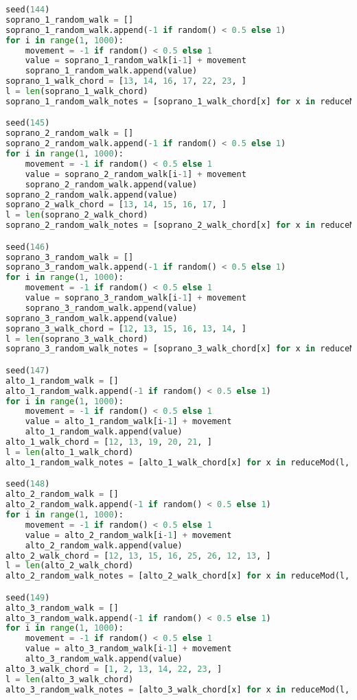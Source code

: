 \begin{lstlisting}[language=Python, caption=Invocation Source Code]
seed(144)
soprano_1_random_walk = []
soprano_1_random_walk.append(-1 if random() < 0.5 else 1)
for i in range(1, 1000):
    movement = -1 if random() < 0.5 else 1
    value = soprano_1_random_walk[i-1] + movement
    soprano_1_random_walk.append(value)
soprano_1_walk_chord = [13, 14, 16, 17, 22, 23, ]
l = len(soprano_1_walk_chord)
soprano_1_random_walk_notes = [soprano_1_walk_chord[x] for x in reduceMod(l, soprano_1_random_walk)]

seed(145)
soprano_2_random_walk = []
soprano_2_random_walk.append(-1 if random() < 0.5 else 1)
for i in range(1, 1000):
    movement = -1 if random() < 0.5 else 1
    value = soprano_2_random_walk[i-1] + movement
    soprano_2_random_walk.append(value)
soprano_2_random_walk.append(value)
soprano_2_walk_chord = [13, 14, 15, 16, 17, ]
l = len(soprano_2_walk_chord)
soprano_2_random_walk_notes = [soprano_2_walk_chord[x] for x in reduceMod(l, soprano_2_random_walk)]

seed(146)
soprano_3_random_walk = []
soprano_3_random_walk.append(-1 if random() < 0.5 else 1)
for i in range(1, 1000):
    movement = -1 if random() < 0.5 else 1
    value = soprano_3_random_walk[i-1] + movement
    soprano_3_random_walk.append(value)
soprano_3_random_walk.append(value)
soprano_3_walk_chord = [12, 13, 15, 16, 13, 14, ]
l = len(soprano_3_walk_chord)
soprano_3_random_walk_notes = [soprano_3_walk_chord[x] for x in reduceMod(l, soprano_3_random_walk)]

seed(147)
alto_1_random_walk = []
alto_1_random_walk.append(-1 if random() < 0.5 else 1)
for i in range(1, 1000):
    movement = -1 if random() < 0.5 else 1
    value = alto_1_random_walk[i-1] + movement
    alto_1_random_walk.append(value)
alto_1_walk_chord = [12, 13, 19, 20, 21, ]
l = len(alto_1_walk_chord)
alto_1_random_walk_notes = [alto_1_walk_chord[x] for x in reduceMod(l, alto_1_random_walk)]

seed(148)
alto_2_random_walk = []
alto_2_random_walk.append(-1 if random() < 0.5 else 1)
for i in range(1, 1000):
    movement = -1 if random() < 0.5 else 1
    value = alto_2_random_walk[i-1] + movement
    alto_2_random_walk.append(value)
alto_2_walk_chord = [12, 13, 15, 16, 25, 26, 12, 13, ]
l = len(alto_2_walk_chord)
alto_2_random_walk_notes = [alto_2_walk_chord[x] for x in reduceMod(l, alto_2_random_walk)]

seed(149)
alto_3_random_walk = []
alto_3_random_walk.append(-1 if random() < 0.5 else 1)
for i in range(1, 1000):
    movement = -1 if random() < 0.5 else 1
    value = alto_3_random_walk[i-1] + movement
    alto_3_random_walk.append(value)
alto_3_walk_chord = [1, 2, 13, 14, 22, 23, ]
l = len(alto_3_walk_chord)
alto_3_random_walk_notes = [alto_3_walk_chord[x] for x in reduceMod(l, alto_3_random_walk)]


\end{lstlisting}
